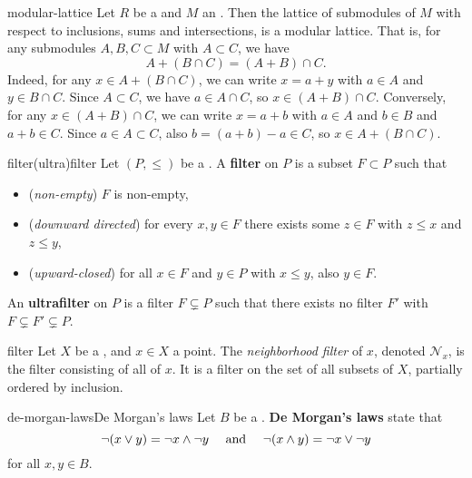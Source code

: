 \begin{example}{modular-lattice}
    Let $R$ be a  and $M$ an . Then the lattice of submodules of $M$ with respect to inclusions, sums and intersections, is a modular lattice. That is, for any submodules $A, B, C \subset M$ with $A \subset C$, we have
    \[ A + (B \cap C) = (A + B) \cap C . \]
    Indeed, for any $x \in A + (B \cap C)$, we can write $x = a + y$ with $a \in A$ and $y \in B \cap C$. Since $A \subset C$, we have $a \in A \cap C$, so $x \in (A + B) \cap C$. Conversely, for any $x \in (A + B) \cap C$, we can write $x = a + b$ with $a \in A$ and $b \in B$ and $a + b \in C$. Since $a \in A \subset C$, also $b = (a + b) - a \in C$, so $x \in A + (B \cap C)$.
\end{example}

\begin{topic}{filter}{(ultra)filter}
    Let $(P, \le)$ be a . A \textbf{filter} on $P$ is a subset $F \subset P$ such that
    \begin{itemize}
        \item (\textit{non-empty}) $F$ is non-empty,
        \item (\textit{downward directed}) for every $x, y \in F$ there exists some $z \in F$ with $z \le x$ and $z \le y$,
        \item (\textit{upward-closed}) for all $x \in F$ and $y \in P$ with $x \le y$, also $y \in F$.
    \end{itemize}
    An \textbf{ultrafilter} on $P$ is a filter $F \subsetneq P$ such that there exists no filter $F'$ with $F \subsetneq F' \subsetneq P$.
\end{topic}

\begin{example}{filter}
    Let $X$ be a , and $x \in X$ a point. The \textit{neighborhood filter} of $x$, denoted $\mathcal{N}_x$, is the filter consisting of all  of $x$. It is a filter on the set of all subsets of $X$, partially ordered by inclusion.
\end{example}

\begin{topic}{de-morgan-laws}{De Morgan's laws}
    Let $B$ be a . \textbf{De Morgan's laws} state that
    \[ \neg (x \lor y) = \neg x \land \neg y \quad \textup{ and } \quad \neg (x \land y) = \neg x \lor \neg y \]
    for all $x, y \in B$.
\end{topic}

